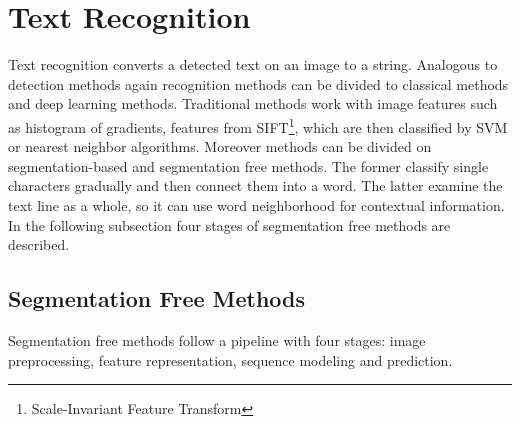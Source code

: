 \section{Text Recognition}

Text recognition converts a detected text on an image to a string. Analogous to detection methods again recognition methods can be divided to classical methods and deep learning methods. Traditional methods work with image features such as histogram of gradients, features from SIFT\footnote{Scale-Invariant Feature Transform}, which are then classified by SVM or nearest neighbor algorithms. Moreover methods can be divided on segmentation-based and segmentation free methods. The former classify single characters gradually and then connect them into a word. The latter examine the text line as a whole, so it can use word neighborhood for contextual information. In the following subsection four stages of segmentation free methods are described.\cite{chen2021text,raisi2020text}

\subsection*{Segmentation Free Methods}

Segmentation free methods follow a pipeline with four stages: image preprocessing, feature representation, sequence modeling and prediction.

